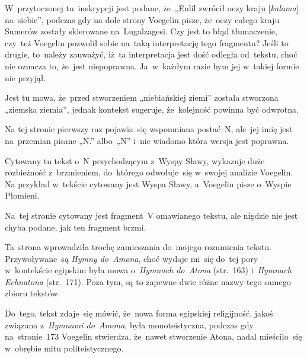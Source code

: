 \documentclass[a4paper,11pt]{article}
\begin{document}
\vspace{\spaceFour}


\start {} W~przytoczonej tu~inskrypcji jest podane, że~„Enlil
zwrócił oczy kraju [\textit{kalama}] na~siebie”, podczas gdy na dole
strony Voegelin pisze, że~oczy całego kraju Sumerów zostały skierowane
na~Lugalzagesi. Czy jest to błąd tłumaczenie, czy~też Voegelin
pozwolił sobie na~taką interpretację tego fragmentu? Jeśli to drugie,
to~należy zauważyć, iż~ta interpretacja jest dość odległa od~tekstu,
choć nie oznacza to, że~jest niepoprawna. Ja~w~każdym razie bym jej
w~takiej formie nie przyjął.

\vspace{\spaceFour}


\start {} Jest tu mowa, że~przed stworzeniem „niebiańskiej
ziemi” została stworzona „ziemska ziemia”, jednak kontekst
sugeruje, że~kolejność powinna być odwrotna.

\vspace{\spaceFour}


\start {} Na tej stronie pierwszy raz pojawia~się wspomniana
postać~N, ale~jej imię jest na~przemian pisane „N.” albo~„N” i~nie
wiadomo która wersja jest poprawna.

\vspace{\spaceFour}


\start {} Cytowany tu tekst o~N przychodzącym z~Wyspy Sławy,
wykazuje duże rozbieżność z~brzmieniem, do~którego odwołuje~się
w~swojej analizie Voegelin. Na przykład w~tekście cytowany jest Wyspa
Sławy, a~Voegelin pisze o~Wyspie Płomieni.

\vspace{\spaceFour}


\start {} Na~tej stronie cytowany jest fragment~V omawianego
tekstu, ale nigdzie nie jest chyba podane, jak ten fragment brzmi.

\vspace{\spaceFour}


\start {} Ta~strona wprowadziła trochę zamieszania do~mojego
rozumienia tekstu. Przywoływane~są \textit{Hymny do~Amona}, choć wydaje
mi~się do~tej pory w~kontekście egipskim była mowa o~\textit{Hymnach
  do~Atona} (str.~163) i~\textit{Hymnach Echnatona} (str.~171). Poza
tym, są to zapewne dwie różne nazwy tego samego zbioru tekstów.

Do~tego, tekst zdaje~się mówić, że~nowa forma egipskiej religijność,
jakoś związana z~\textit{Hymnami do~Amona}, była monoteistyczna, podczas
gdy na~stronie~173 Voegelin stwierdza, że~nawet stworzenie Atona,
nadal mieściło~się w~obrębie mitu politeistycznego.
\end{document}
